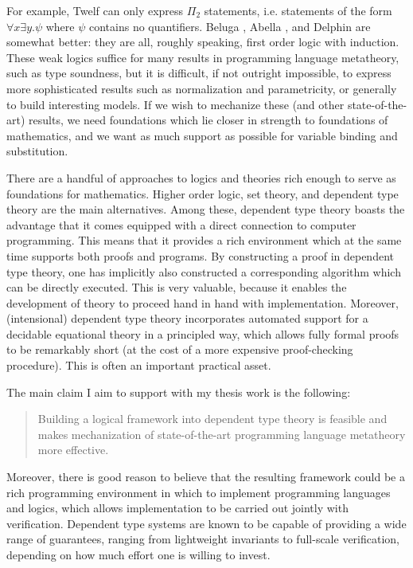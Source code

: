 \documentclass{article}
\newcommand{\LONGVERSION}[1]{{\color{light-gray}#1}}
\begin{document}
For example, Twelf \citep{Pfenning99cade} can only express $\Pi_2$
statements, i.e. statements of the form $\forall x \exists y. \psi$
where $\psi$ contains no quantifiers. Beluga \citep{Pientka:IJCAR10}, Abella \citep{Gacek:IJCAR08}, and
Delphin \citep{Poswolsky:DelphinDesc08} are
somewhat better: they are all, roughly speaking, first order logic
with induction. These weak logics suffice for many results in
programming language metatheory, such as type soundness, but it is
difficult, if not outright impossible, to express more sophisticated
results such as normalization and parametricity, or generally to build
interesting models. If we wish to mechanize these (and other
state-of-the-art) results, we need foundations which lie closer in
strength to foundations of mathematics, and we want as much support as
possible for variable binding and substitution.

There are a handful of approaches to logics and theories rich enough
to serve as foundations for mathematics. Higher order logic, set theory, and dependent
type theory are the main alternatives. Among these, dependent type theory
\citep{Martin-Loef73a} boasts the advantage that it comes equipped with a direct
connection to computer programming. This means that it provides a rich
environment which at the same time supports both proofs and
programs. By constructing a proof in dependent type theory, one has
implicitly also constructed a corresponding algorithm which can be
directly executed. This is very valuable, because it
enables the development of theory to proceed hand in hand
with implementation. Moreover, (intensional) dependent type theory
incorporates automated support for a decidable equational theory in a
principled way, which allows fully formal proofs to be remarkably
short (at the cost of a more expensive proof-checking
procedure). This is often an important practical asset. 

The main claim I aim to support with my thesis work is the following:

\begin{quote}Building a logical framework into dependent type
theory is feasible and makes mechanization of state-of-the-art programming
language metatheory more effective.
\end{quote}

Moreover, there is good reason to believe that the resulting framework
could be a rich programming
environment in which to implement programming languages and logics, which allows
implementation to be carried out jointly with verification. Dependent
type systems are known to be capable of providing a wide range of
guarantees, ranging from lightweight 
invariants to full-scale verification, depending on how
much effort one is willing to invest.
\end{document}
